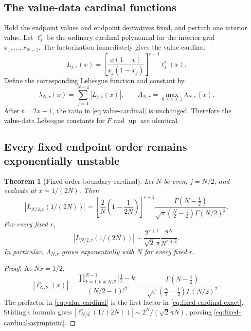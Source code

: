 \documentclass[11pt,oneside]{article}
\newtheorem{theorem}{Theorem}[section]
\theoremstyle{definition}
\theoremstyle{remark}
\newcommand{\Up}{\operatorname{up}}
\begin{document}
\subsection{The value-data cardinal functions}

Hold the endpoint values and endpoint derivatives fixed, and perturb one interior value.
Let $\ell_j^\circ$ be the ordinary cardinal polynomial for the interior grid
$x_1,\ldots,x_{N-1}$.  The factorization immediately gives the value cardinal
\begin{equation}
 L_{j,r}(x)=
 \left[\frac{x(1-x)}{x_j(1-x_j)}\right]^{r+1}
 \ell_j^\circ(x).
 \label{eq:value-cardinal}
\end{equation}
Define the corresponding Lebesgue function and constant by
\begin{equation}
 \lambda_{N,r}(x)=\sum_{j=1}^{N-1}|L_{j,r}(x)|,
 \qquad
 \Lambda_{N,r}=\max_{0\le x\le1}\lambda_{N,r}(x).
 \label{eq:flat-lebesgue}
\end{equation}
After $t=2x-1$, the ratio in \eqref{eq:value-cardinal} is unchanged.  Therefore the
value-data Lebesgue constants for $F$ and $\Up$ are identical.

\subsection{Every fixed endpoint order remains exponentially unstable}

\begin{theorem}[Fixed-order boundary cardinal]
\label{thm:fixed-r}
Let $N$ be even, $j=N/2$, and evaluate at $x=1/(2N)$.  Then
\begin{equation}
 |L_{N/2,r}(1/(2N))|
 =\left[\frac{2}{N}\left(1-\frac{1}{2N}\right)\right]^{r+1}
 \frac{\Gamma(N-\tfrac12)}
 {\sqrt\pi(\tfrac N2-\tfrac12)\Gamma(N/2)^2}.
 \label{eq:fixed-cardinal-exact}
\end{equation}
For every fixed $r$,
\begin{equation}
 |L_{N/2,r}(1/(2N))|
 \sim \frac{2^{r+1}}{\sqrt2\,\pi}
 \frac{2^N}{N^{r+2}}.
 \label{eq:fixed-cardinal-asymptotic}
\end{equation}
In particular, $\Lambda_{N,r}$ grows exponentially with $N$ for every fixed $r$.
\end{theorem}

\begin{proof}
At $Nx=1/2$,
\[
 |\ell_{N/2}^\circ(x)|
 =\frac{\prod_{k=1,k\ne N/2}^{N-1}|\tfrac12-k|}
 {(N/2-1)!^2}
 =\frac{\Gamma(N-\tfrac12)}
 {\sqrt\pi(\tfrac N2-\tfrac12)\Gamma(N/2)^2}.
\]
The prefactor in \eqref{eq:value-cardinal} is the first factor in
\eqref{eq:fixed-cardinal-exact}.  Stirling's formula gives
$|\ell_{N/2}^\circ(1/(2N))|\sim2^N/(\sqrt2\pi N)$, proving
\eqref{eq:fixed-cardinal-asymptotic}.
\end{proof}
\end{document}
